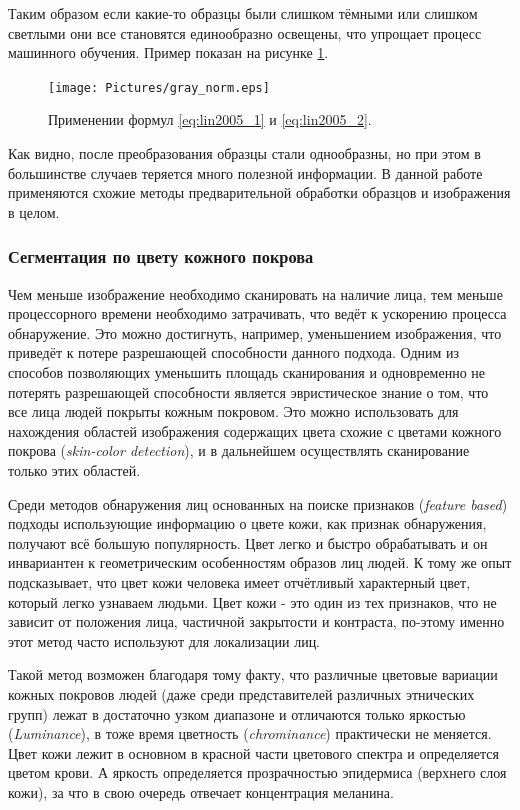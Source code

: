 \documentclass[12pt]{report}
\begin{document}
Таким образом если какие-то образцы были слишком тёмными или слишком светлыми они все становятся единообразно 
освещены, что упрощает процесс машинного обучения. Пример показан на рисунке \ref{fig:gray_norm}.

\begin{figure}[h]
	\centering
	\texttt{[image: Pictures/gray\_norm.eps]}
	\caption{Применении формул \ref{eq:lin2005_1} и \ref{eq:lin2005_2}.}
	\label{fig:gray_norm}
\end{figure}

Как видно, после преобразования образцы стали однообразны, но при этом в большинстве случаев теряется много полезной 
информации. В данной работе применяются схожие методы предварительной обработки образцов и изображения в целом. 

\subsubsection{Сегментация по цвету кожного покрова}
\label{sec:skin_segm}
Чем меньше изображение необходимо сканировать на наличие лица, тем меньше процессорного времени необходимо 
затрачивать, что ведёт к ускорению процесса обнаружение. Это можно достигнуть, например, уменьшением изображения, что 
приведёт к потере разрешающей способности данного подхода. Одним из способов позволяющих уменьшить площадь 
сканирования и одновременно не потерять разрешающей способности является эвристическое знание о том, что все лица 
людей покрыты кожным покровом. Это можно использовать для нахождения областей изображения содержащих цвета схожие с 
цветами кожного покрова (\textit{skin-color detection}), и в дальнейшем осуществлять сканирование только этих 
областей.

Среди методов обнаружения лиц основанных на поиске признаков (\textit{feature based}) подходы использующие информацию 
о цвете кожи, как признак обнаружения, получают всё большую популярность. Цвет легко и быстро обрабатывать и он 
инвариантен к геометрическим особенностям образов лиц людей. К тому же опыт подсказывает, что цвет кожи человека 
имеет отчётливый характерный цвет, который легко узнаваем людьми. \citep{vezhnevets2003survey} Цвет кожи - это один 
из тех признаков, что не зависит от положения лица, частичной закрытости и контраста, по-этому именно этот метод 
часто используют для локализации лиц. \citep{ruangyam2009efficient}

Такой метод возможен благодаря тому факту, что различные цветовые вариации кожных покровов людей (даже среди 
представителей различных этнических групп) лежат в достаточно узком диапазоне и отличаются только яркостью (\textit
{Luminance}), в тоже время цветность (\textit{chrominance}) практически не меняется. Цвет кожи лежит в основном в 
красной части цветового спектра и определяется цветом крови. А яркость определяется прозрачностью эпидермиса 
(верхнего слоя кожи), за что в свою очередь отвечает концентрация меланина. \citep{xu2006color} %
\end{document}
